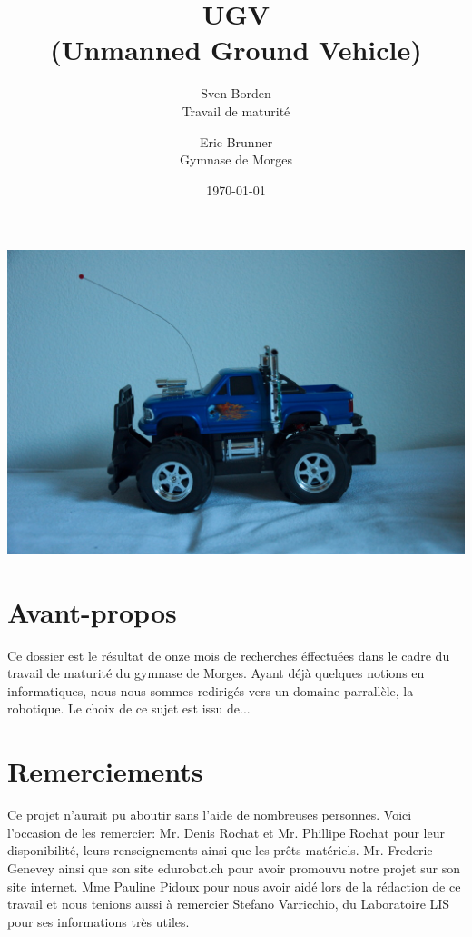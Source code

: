 \documentclass[a4paper,12pt]{article}
\begin{document}
{\selectfont %
\title{UGV \\(Unmanned Ground Vehicle)}
\author{Sven Borden\\ \small Travail de maturité \and  Eric Brunner\\ \small Gymnase de Morges}
\date{\today}
\maketitle

\begin{centering}
\includegraphics[width=1.0\textwidth]{DSC_8469res}
\end{centering}

\clearpage


\section*{Avant-propos}

Ce dossier est le résultat de onze mois de recherches éffectuées dans le cadre du travail de maturité du gymnase de Morges. Ayant déjà quelques notions en informatiques, nous nous sommes redirigés  vers un domaine parrallèle, la robotique. Le choix de ce sujet est issu de...

\clearpage

\section*{Remerciements}
Ce projet n'aurait pu aboutir sans l'aide de nombreuses personnes. Voici l'occasion de les remercier: Mr. Denis Rochat et Mr. Phillipe Rochat pour leur disponibilité, leurs renseignements ainsi que les prêts matériels. Mr. Frederic Genevey ainsi que son site edurobot.ch pour avoir promouvu notre projet sur son site internet. Mme Pauline Pidoux pour nous avoir aidé lors de la rédaction de ce travail et nous tenions aussi à remercier Stefano Varricchio, du Laboratoire LIS pour ses informations très utiles.

}
\end{document}
